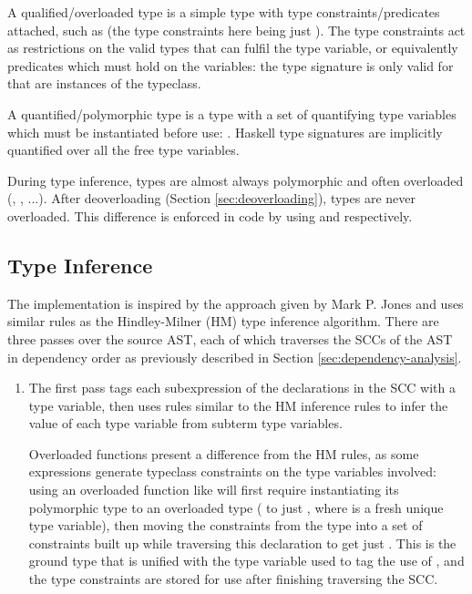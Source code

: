 \documentclass[dissertation.tex]{subfiles}
\begin{document}
{{        A qualified/overloaded type is a simple type with type constraints/predicates attached, such as  (the type constraints here being just ). The type constraints act as restrictions on the valid types that can fulfil the type variable, or equivalently predicates which must hold on the variables: the type signature is only valid for  that are instances of the  typeclass. 

        A quantified/polymorphic type is a type with a set of quantifying type variables which must be instantiated before use: . Haskell type signatures are implicitly quantified over all the free type variables.

        During type inference, types are almost always polymorphic and often overloaded (, , ...). After deoverloading (Section \ref{sec:deoverloading}), types are never overloaded. This difference is enforced in code by using  and  respectively.
    }
    \subsection{Type Inference}
    {
        The implementation is inspired by the approach given by Mark P. Jones\cite{THIH} and uses similar rules as the Hindley-Milner (HM) type inference algorithm. There are three passes over the source AST, each of which traverses the SCCs of the AST in dependency order as previously described in Section \ref{sec:dependency-analysis}.

        \begin{enumerate}
        \item
        {
            The first pass tags each subexpression of the declarations in the SCC with a type variable, then uses rules similar to the HM inference rules to infer the value of each type variable from subterm type variables.
            
            Overloaded functions present a difference from the HM rules, as some expressions generate typeclass constraints on the type variables involved: using an overloaded function like \haskell{(+)} will first require instantiating its polymorphic type to an overloaded type ( to just , where  is a fresh unique type variable), then moving the constraints from the type into a set of constraints built up while traversing this declaration to get just . This is the ground type that is unified with the type variable used to tag the use of \haskell{(+)}, and the type constraints are stored for use after finishing traversing the SCC.

}
\end{enumerate}}}
\end{document}
